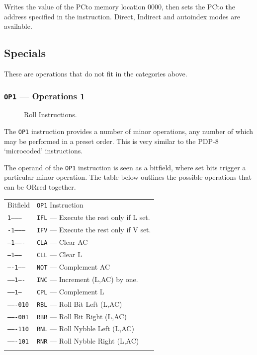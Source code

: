 \documentclass[11pt,a4paper,twocolumns]{article}
\newcommand\hex[1]{\textsf{#1}}
\newcommand\register[1]{\textsf{#1}}
\newcommand\A{\register{AC}}
\newcommand\Lreg{\register{L}}
\newcommand\Vreg{\register{V}}
\newcommand\PC{\register{PC}}
\begin{document}
Writes the value of the \PC to memory location \hex{0000}, then sets
the \PC to the address specified in the instruction. Direct, Indirect
and autoindex modes are available.

\subsection{Specials}

These are operations that do not fit in the categories above.

\subsubsection{{\tt OP1} — Operations 1}
\label{sec-op1}

\begin{figure}[tb]
  \centering
  
  \caption{\label{fig-roll}Roll Instructions.}
\end{figure}

The {\tt OP1} instruction provides a number of minor operations, any
number of which may be performed in a preset order. This is very
similar to the PDP-8 ‘microcoded’ instructions.

The operand of the {\tt OP1} instruction is seen as a bitfield, where
set bits trigger a particular minor operation. The table below
outlines the possible operations that can be ORred together.

\vspace{1em}\noindent\begin{center}
\begin{tabular}{ll}
  Bitfield & {\tt OP1} Instruction \\\noalign{\smallskip}\hline\noalign{\smallskip}
  {\tt 1---------} & {\tt IFL} — Execute the rest only if \Lreg{} set.\\
  {\tt -1--------} & {\tt IFV} — Execute the rest only if \Vreg{} set.\\
  {\tt --1-------} & {\tt CLA} — Clear \A \\
  {\tt ---1------} & {\tt CLL} — Clear \Lreg \\
  {\tt ----1-----} & {\tt NOT} — Complement \A \\
  {\tt -----1----} & {\tt INC} — Increment (\Lreg,\A) by one. \\
  {\tt ------1---} & {\tt CPL} — Complement \Lreg \\
  {\tt -------010} & {\tt RBL} — Roll Bit Left (\Lreg,\A) \\
  {\tt -------001} & {\tt RBR} — Roll Bit Right (\Lreg,\A) \\
  {\tt -------110} & {\tt RNL} — Roll Nybble Left (\Lreg,\A) \\
  {\tt -------101} & {\tt RNR} — Roll Nybble Right (\Lreg,\A) \\\noalign{\smallskip}\hline\noalign{\smallskip}
\end{tabular}
\end{center}\vspace{1em}
\end{document}

